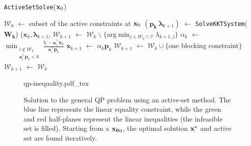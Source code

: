 \begin{algorithm}
\caption{\texttt{ActiveSetSolve}($\mathbf{x}_0$)}
\label{alg:chap3-active-set}
\begin{algorithmic}
\STATE $\mathcal{W}_0$ $\leftarrow$ subset of the active constraints at $\mathbf{x}_0$
\STATE $(\mathbf{p_k}~\boldsymbol{\lambda}_{k+1})$ $\leftarrow$ \texttt{SolveKKTSystem}($\mathbf{W_k}$)
\RETURN ($\mathbf{x}_k,\boldsymbol{\lambda}_{k+1)}$
\ELSE
{}
\STATE $\mathcal{W}_{k+1}$ $\leftarrow$ $\mathcal{W}_k \backslash \{\text{arg}\min_{j\in\mathcal{W}_k\cap\mathcal{I}}\lambda_{k+1,j}\}$
\ENDIF
\ELSE
{}
\STATE $\alpha_k$ $\leftarrow$ $\min_{\substack{i\notin\mathcal{W}_k\\\mathbf{a}_i^{\top}\mathbf{p}_k<0}} \frac{b_i-\mathbf{a}_i^{\top}\mathbf{x}_k}{\mathbf{a}_i^{\top}\mathbf{p}_k}$
\STATE $\mathbf{x}_{k+1}$ $\leftarrow$ $\alpha_k\mathbf{p}_k$
\STATE $\mathcal{W}_{k+1}$ $\leftarrow$ $\mathcal{W}_k\cup\{$one blocking constraint$\}$
\ELSE
{}
\STATE $\mathcal{W}_{k+1}$ $\leftarrow$ $\mathcal{W}_k$
\ENDIF
\ENDIF
\ENDFOR
\end{algorithmic}
\end{algorithm}

\begin{figure}
  \centering
      {\def\svgwidth{0.8\linewidth}
        {\footnotesize
          
                     {qp-inequality.pdf_tex}
        }
      }
      \caption{Solution to the general QP problem using an active-set
        method. The blue line represents the linear equality
        constraint, while the green and red half-planes represent the
        linear inequalities (the infeasible set is filled). Starting
        from a $\mathbf{x_0}_0$, the optimal solution $\mathbf{x}^{\star}$ and
        active set are found iteratively.}
      \label{fig:chap3-qp-inequality}
\end{figure}

